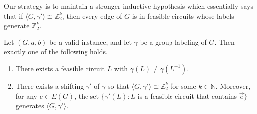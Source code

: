 \documentclass[a4paper, 12pt]{article}
\newcommand{\RMM}[1]{\textcolor{orange}{RM: #1}}
\newcommand{\CM}[1]{\todo[linecolor=red,bordercolor=white,color=Magenta,backgroundcolor=CornflowerBlue!40,textcolor=black,size=\footnotesize]{\textsf{CM: #1}}}
\begin{document}
Our strategy is to maintain a stronger inductive hypothesis which essentially says that if $\langle G, \gamma'\rangle \cong \mathbb{Z}_2^k$, then every edge of $G$ is in feasible circuits whose labels generate $\mathbb{Z}_2^k$.


\begin{proposition}
\label{prop:3edgeConn}
Let $(G, a,b)$ be a valid instance, and let $\gamma$ be a group-labeling of $G$. Then exactly one of the following holds.\begin{enumerate}
    \item There exists a feasible circuit $L$ with $\gamma(L)\neq \gamma(L^{-1})$.
    \item There exists a shifting $\gamma'$ of $\gamma$ so that $\langle G, \gamma'\rangle\cong \mathbb{Z}_2^k$ for some $k\in \mathbb{N}$. Moreover, for any $e\in E(G)$, the set $\{\gamma'(L): L$ is a feasible circuit that contains $\vec{e}\}$ generates $\langle G, \gamma'\rangle$.
\end{enumerate}
\end{proposition}
\end{document}
